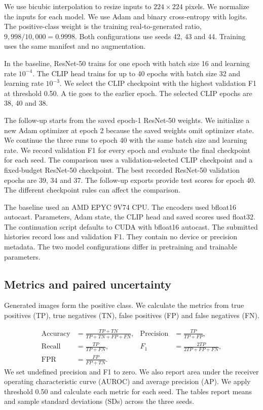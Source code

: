 \documentclass[11pt,a4paper]{article}
\begin{document}
We use bicubic interpolation to resize inputs to $224\times224$ pixels. We normalize the inputs for each model. We use Adam and binary cross-entropy with logits. The positive-class weight is the training real-to-generated ratio, $9,998/10,000=0.9998$. Both configurations use seeds 42, 43 and 44. Training uses the same manifest and no augmentation.

In the baseline, ResNet-50 trains for one epoch with batch size 16 and learning rate $10^{-4}$. The CLIP head trains for up to 40 epochs with batch size 32 and learning rate $10^{-3}$. We select the CLIP checkpoint with the highest validation F1 at threshold 0.50. A tie goes to the earlier epoch. The selected CLIP epochs are 38, 40 and 38.

The follow-up starts from the saved epoch-1 ResNet-50 weights. We initialize a new Adam optimizer at epoch 2 because the saved weights omit optimizer state. We continue the three runs to epoch 40 with the same batch size and learning rate. We record validation F1 for every epoch and evaluate the final checkpoint for each seed. The comparison uses a validation-selected CLIP checkpoint and a fixed-budget ResNet-50 checkpoint. The best recorded ResNet-50 validation epochs are 39, 34 and 37. The follow-up exports provide test scores for epoch 40. The different checkpoint rules can affect the comparison.

The baseline used an AMD EPYC 9V74 CPU. The encoders used bfloat16 autocast. Parameters, Adam state, the CLIP head and saved scores used float32. The continuation script defaults to CUDA with bfloat16 autocast. The submitted histories record loss and validation F1. They contain no device or precision metadata. The two model configurations differ in pretraining and trainable parameters.

\subsection{Metrics and paired uncertainty}
Generated images form the positive class. We calculate the metrics from true positives (TP), true negatives (TN), false positives (FP) and false negatives (FN).

\begin{align}
\mathrm{Accuracy}&=\frac{TP+TN}{TP+TN+FP+FN}, &
\mathrm{Precision}&=\frac{TP}{TP+FP},\\
\mathrm{Recall}&=\frac{TP}{TP+FN}, &
F_1&=\frac{2TP}{2TP+FP+FN},\\
\mathrm{FPR}&=\frac{FP}{FP+TN}. &&
\end{align}
We set undefined precision and F1 to zero. We also report area under the receiver operating characteristic curve (AUROC) and average precision (AP). We apply threshold 0.50 and calculate each metric for each seed. The tables report means and sample standard deviations (SDs) across the three seeds.
\end{document}
